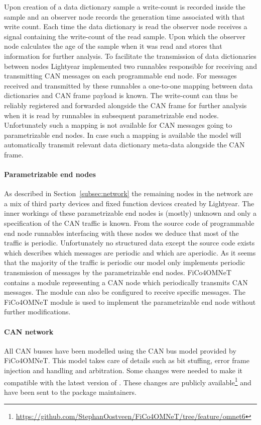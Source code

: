 Upon creation of a data dictionary sample a write-count is recorded inside the sample and an observer node records the generation time associated with that write count. Each time the data dictionary is read the observer node receives a signal containing the write-count of the read sample. Upon which the observer node calculates the age of the sample when it was read and stores that information for further analysis. To facilitate the transmission of data dictionaries between nodes Lightyear implemented two runnables responsible for receiving and transmitting CAN messages on each programmable end node. For messages received and transmitted by these runnables a one-to-one mapping between data dictionaries and CAN frame payload is known. The write-count can thus be reliably registered and forwarded alongside the CAN frame for further analysis when it is read by runnables in subsequent parametrizable end nodes. Unfortunately such a mapping is not available for CAN messages going to parametrizable end nodes. In case such a mapping is available the model will automatically transmit relevant data dictionary meta-data alongside the CAN frame.

\paragraph{Parametrizable end nodes} As described in Section~\ref{subsec:network} the remaining nodes in the network are a mix of third party devices and fixed function devices created by Lightyear. The inner workings of these parametrizable end nodes is (mostly) unknown and only a specification of the CAN traffic is known. From the source code of programmable end node runnables interfacing with these nodes we deduce that most of the traffic is periodic. Unfortunately no structured data except the source code exists which describes which messages are periodic and which are aperiodic. As it seems that the majority of the traffic is periodic our model only implements periodic transmission of messages by the parametrizable end nodes. FiCo4OMNeT contains a module representing a CAN node which periodically transmits CAN messages. The module can also be configured to receive specific messages. The FiCo4OMNeT module is used to implement the parametrizable end node without further modifications.

\paragraph{CAN network} All CAN busses have been modelled using the CAN bus model provided by FiCo4OMNeT. This model takes care of details such as bit stuffing, error frame injection and handling and arbitration. Some changes were needed to make it compatible with the latest version of \omnet. These changes are publicly available\footnote{\url{https://github.com/StephanOostveen/FiCo4OMNeT/tree/feature/omnet6}} and have been sent to the package maintainers. 